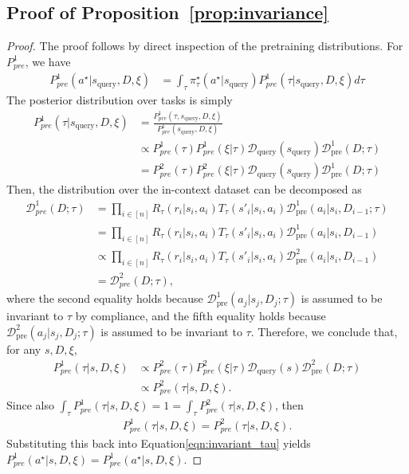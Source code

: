 \documentclass{article}
\newcommand{\Dcal}{\mathcal{D}}
\newcommand{\pretraind}{\Dcal_{\text{pre}}}
\newcommand{\squery}{s_{\text{query}}}
\newcommand{\Dquery}{\Dcal_{\text{query}}}
\newcommand{\pistar}{\pi^{\star}}
\begin{document}
\subsection{Proof of Proposition~\ref{prop:invariance}}
\propinvariance*
\begin{proof}
    The proof follows by direct inspection of the pretraining distributions. For $P^1_{pre}$, we have
    \begin{align}
         P^1_{pre} ( a^\star | \squery, D, \xi) & = \int_{\tau} \pistar_\tau(a^\star | \squery) P^1_{pre}(\tau| \squery, D, \xi) d \tau \label{eqn:invariant_tau}
    \end{align}
    The posterior distribution over tasks is simply
    \begin{align}
     P^1_{pre}(\tau| \squery, D, \xi) & = \frac{P^1_{pre}(\tau, \squery, D, \xi)}{P^1_{pre}(\squery, D, \xi)} \\
     & \propto P^1_{pre}(\tau) P^1_{pre} (\xi | \tau)  \Dquery(\squery) \pretraind^1 (D ; \tau) \\
     & = P^2_{pre}(\tau) P^2_{pre} (\xi | \tau)  \Dquery(\squery) \pretraind^1 (D ; \tau)
    \end{align}
    Then, the distribution over the in-context dataset can be decomposed as
    \begin{align}
        \Dcal^1_{pre} (D ; \tau) & = \prod_{i \in [n]} R_\tau(r_i | s_i, a_i) T_\tau(s'_i | s_i, a_i) \pretraind^1( a_i | s_i, D_{i - 1}; \tau) \\
        & = \prod_{i \in [n]} R_\tau(r_i | s_i, a_i) T_\tau(s'_i | s_i, a_i) \pretraind^1( a_i | s_i, D_{i - 1}) \\
        & \propto \prod_{i \in [n]} R_\tau(r_i | s_i, a_i) T_\tau(s'_i | s_i, a_i) \pretraind^2( a_i | s_i, D_{i - 1}) \\
        & =  \Dcal^2_{pre} (D ; \tau),
    \end{align}
    where the second equality holds because $\pretraind^1(a_j|s_j,D_j; \tau)$ is assumed to be invariant to $\tau$ by compliance, and the fifth equality holds because $\pretraind^2(a_j|s_j,D_j; \tau)$ is assumed to be invariant to $\tau$.
    Therefore, we conclude that, for any $s, D, \xi$,
    \begin{align}
        P^1_{pre}(\tau| s, D, \xi) & \propto P^2_{pre}(\tau) P^2_{pre} (\xi | \tau)  \Dquery(s) \pretraind^2 (D ; \tau) \\
        & \propto P^2_{pre}(\tau| s, D, \xi).
    \end{align}
    Since also $\int_{\tau} P^1_{pre}(\tau| s, D, \xi) = 1 = \int_{\tau} P^2_{pre}(\tau| s, D, \xi) $, then
    \begin{align}
P^1_{pre}(\tau| s, D, \xi) =  P^2_{pre}(\tau| s, D, \xi).
\end{align}
    Substituting this back into Equation\ref{eqn:invariant_tau} yields $P^1_{pre} ( a^\star | s, D, \xi) = P^1_{pre} ( a^\star | s, D, \xi)$.
\end{proof}
\end{document}
